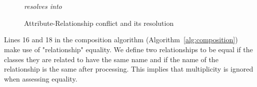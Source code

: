 \documentclass[sigconf]{acmart}
\begin{document}
\begin{figure}[h]
    \centering
    \quad  \quad
    \\ \quad \\
    \textit{resolves into}\\
    \caption{Attribute-Relationship conflict and its resolution}
    \label{fig:attribute-rel-conflict}
\end{figure}

Lines 16 and 18 in the composition algorithm (Algorithm~\ref{alg:composition}) make use of "relationship" equality. We define two relationships to be equal if the classes they are related to have the same name and if the name of the relationship is the same after processing. This implies that multiplicity is ignored when assessing equality.
\end{document}
